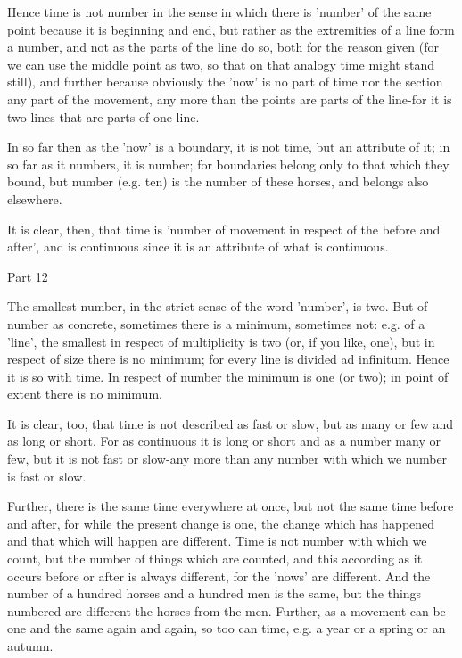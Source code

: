Hence time is not number in the sense in which there is 'number' of
the same point because it is beginning and end, but rather as the
extremities of a line form a number, and not as the parts of the line
do so, both for the reason given (for we can use the middle point
as two, so that on that analogy time might stand still), and further
because obviously the 'now' is no part of time nor the section any
part of the movement, any more than the points are parts of the line-for
it is two lines that are parts of one line. 

In so far then as the 'now' is a boundary, it is not time, but an
attribute of it; in so far as it numbers, it is number; for boundaries
belong only to that which they bound, but number (e.g. ten) is the
number of these horses, and belongs also elsewhere. 

It is clear, then, that time is 'number of movement in respect of
the before and after', and is continuous since it is an attribute
of what is continuous. 

Part 12

The smallest number, in the strict sense of the word 'number', is
two. But of number as concrete, sometimes there is a minimum, sometimes
not: e.g. of a 'line', the smallest in respect of multiplicity is
two (or, if you like, one), but in respect of size there is no minimum;
for every line is divided ad infinitum. Hence it is so with time.
In respect of number the minimum is one (or two); in point of extent
there is no minimum. 

It is clear, too, that time is not described as fast or slow, but
as many or few and as long or short. For as continuous it is long
or short and as a number many or few, but it is not fast or slow-any
more than any number with which we number is fast or slow.

Further, there is the same time everywhere at once, but not the same
time before and after, for while the present change is one, the change
which has happened and that which will happen are different. Time
is not number with which we count, but the number of things which
are counted, and this according as it occurs before or after is always
different, for the 'nows' are different. And the number of a hundred
horses and a hundred men is the same, but the things numbered are
different-the horses from the men. Further, as a movement can be one
and the same again and again, so too can time, e.g. a year or a spring
or an autumn. 

